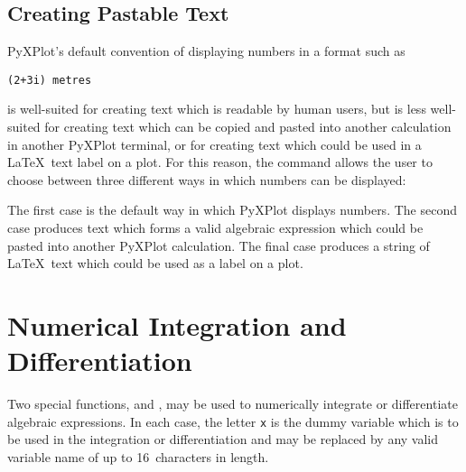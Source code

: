 \subsection{Creating Pastable Text}
\label{sec:pastable}

PyXPlot's default convention of displaying numbers in a format such as

\begin{verbatim}
(2+3i) metres
\end{verbatim}

\noindent is well-suited for creating text which is readable by human users, but
is less well-suited for creating text which can be copied and pasted into
another calculation in another PyXPlot terminal, or for creating text which
could be used in a \LaTeX\ text label on a plot. For this reason, the
 command allows the user to choose between three
different ways in which numbers can be displayed:

\vspace{3mm}
\newline
{}\newline
{}\newline
{}\newline
{}\newline
{}\newline
{}\newline
{}\newline
{}
\vspace{3mm}

The first case is the default way in which PyXPlot displays numbers. The second
case produces text which forms a valid algebraic expression which could be
pasted into another PyXPlot calculation. The final case produces a string of
\LaTeX\ text which could be used as a label on a plot.

\section{Numerical Integration and Differentiation}

 Two special functions,
 and , may be used to numerically
integrate or differentiate algebraic expressions.  In each case, the letter
{\tt x} is the dummy variable which is to be used in the integration or
differentiation and may be replaced by any valid variable name of up to
16~characters in length.

